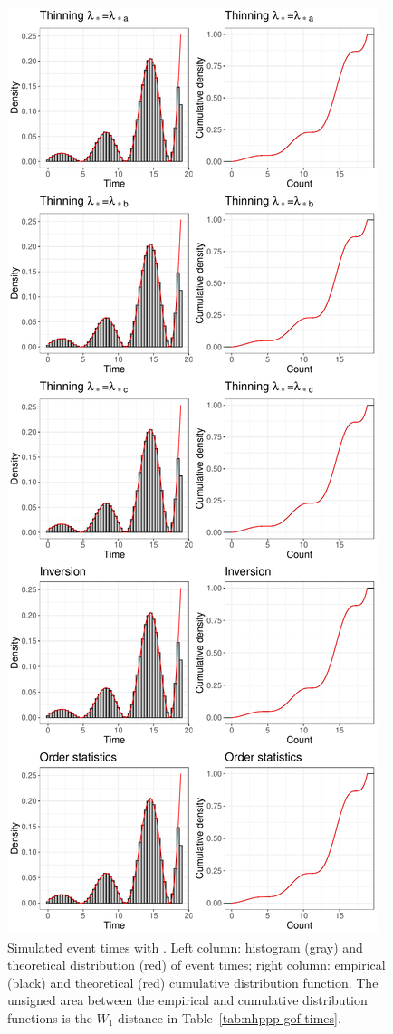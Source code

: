 \documentclass[article]{jss}\usepackage[]{graphicx}\usepackage[]{xcolor}
\makeatletter
\def\maxwidth{ %
  \ifdim\Gin@nat@width>\linewidth
    \linewidth
  \else
    \Gin@nat@width
  \fi
}
\newenvironment{knitrout}{}{} %
\makeatother
\begin{document}
\begin{knitrout}
\color{fgcolor}\begin{figure}

{\centering \includegraphics[width=\maxwidth,height=\textheight,keepaspectratio=true]{figure/epdf-nhppp-pkg-times-1} 

}

\caption{Simulated event times with . Left column: histogram (gray) and theoretical distribution (red) of event times; right column: empirical (black) and theoretical (red) cumulative distribution function. The unsigned area between the empirical and cumulative distribution functions is the $W_1$ distance in Table~\ref{tab:nhppp-gof-times}.}\label{fig:epdf-nhppp-pkg-times}
\end{figure}

\end{knitrout}
\end{document}
